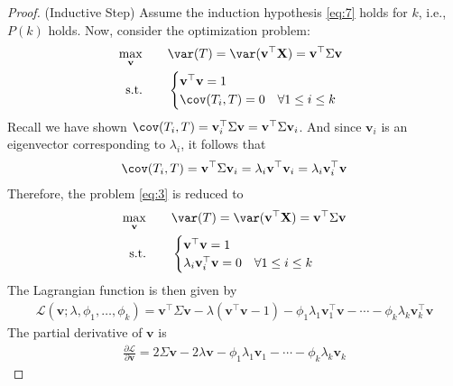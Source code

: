 \documentclass[color=blue, thmcnt=section, 12pt]{elegantbook}
\begin{document}
\begin{proof}
    \par (Inductive Step) Assume the induction hypothesis \eqref{eq:7} holds for $k$, i.e., $P(k)$ holds. Now, consider the optimization problem:
    \begin{alignat}{2}
        \max_{\mathbf{v}}&\quad & &\var(T) = \var(\mathbf{v}^\top \mathbf{X}) = \mathbf{v}^\top \Sigma \mathbf{v} \label{eq:3}\\ 
        \text{s.t.}& & &\begin{cases}
            \mathbf{v}^\top \mathbf{v} = 1 \nonumber\\
            \cov(T_i, T) = 0 \quad \forall 1 \leq i \leq k
        \end{cases}
    \end{alignat}
    Recall we have shown $\cov(T_i, T) = \mathbf{v}_i^\top \Sigma \mathbf{v} = \mathbf{v}^\top \Sigma \mathbf{v}_i$. And since $\mathbf{v}_i$ is an eigenvector corresponding to $\lambda_i$, it follows that
    \begin{align*}
        \cov(T_i, T) 
        = \mathbf{v}^\top \Sigma \mathbf{v}_i 
        = \lambda_i \mathbf{v}^\top \mathbf{v}_i
        = \lambda_i \mathbf{v}_i^\top \mathbf{v}
    \end{align*}
    Therefore, the problem \eqref{eq:3} is reduced to 
    \begin{alignat}{2}
        \max_{\mathbf{v}}&\quad & &\var(T) = \var(\mathbf{v}^\top \mathbf{X}) = \mathbf{v}^\top \Sigma \mathbf{v} \label{eq:4}\\ 
        \text{s.t.}& & &\begin{cases}
            \mathbf{v}^\top \mathbf{v} = 1 \nonumber\\
            \lambda_i \mathbf{v}_i^\top \mathbf{v} = 0 \quad \forall 1 \leq i \leq k
        \end{cases}
    \end{alignat}
    The Lagrangian function is then given by 
    \begin{align*}
        \mathcal{L}(\mathbf{v}; \lambda, \phi_1, \ldots, \phi_k)
        = \mathbf{v}^\top \Sigma \mathbf{v}
        - \lambda(\mathbf{v}^\top \mathbf{v} - 1)
        - \phi_1 \lambda_1 \mathbf{v}_1^\top \mathbf{v}
        - \cdots 
        - \phi_k \lambda_k \mathbf{v}_k^\top \mathbf{v}
    \end{align*}
    The partial derivative of $\mathbf{v}$ is 
    \begin{align*}
        \frac{\partial \mathcal{L}}{\partial \mathbf{v}}
        = 2 \Sigma \mathbf{v} - 2\lambda \mathbf{v}
        - \phi_1 \lambda_1 \mathbf{v}_1
        - \cdots
        - \phi_k \lambda_k \mathbf{v}_k
    \end{align*}
    

\end{proof}
\end{document}
